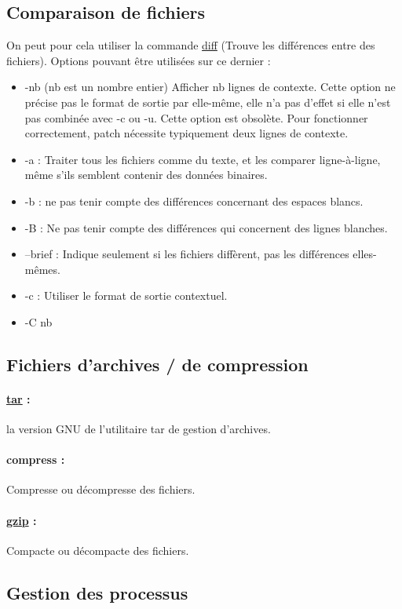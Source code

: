 \documentclass{article}[12pt]
\begin{document}
\subsection{ Comparaison de fichiers}
On peut pour cela utiliser la commande \href{http://jp.barralis.com/linux-man/man1/diff.1.php}{diff} (Trouve les différences entre des fichiers). Options pouvant être utilisées sur ce dernier :
\begin{itemize}
\item -nb (nb est un nombre entier) Afficher nb lignes de contexte. Cette option ne précise pas le format de sortie par elle-même, elle n'a pas d'effet si elle n'est pas combinée avec -c ou -u. Cette option est obsolète. Pour fonctionner correctement, patch nécessite typiquement deux lignes de contexte.
\item -a : Traiter tous les fichiers comme du texte, et les comparer ligne-à-ligne, même s'ils semblent contenir des données binaires.
\item -b : ne pas tenir compte des différences concernant des espaces blancs.
\item -B : Ne pas tenir compte des différences qui concernent des lignes blanches.
\item --brief : Indique seulement si les fichiers diffèrent, pas les différences elles-mêmes.
\item -c : Utiliser le format de sortie contextuel.
\item -C nb
\end{itemize}
\subsection{Fichiers d'archives / de compression}
\paragraph{\href{http://jp.barralis.com/linux-man/man1/tar.1.php}{tar} : } la version GNU de l'utilitaire tar de gestion d'archives.  
\paragraph{compress : } Compresse ou décompresse des fichiers.
\paragraph{\href{http://jp.barralis.com/linux-man/man1/gzip.1.php}{gzip} : } Compacte ou décompacte des fichiers. 
\subsection{Gestion des processus}
\end{document}
